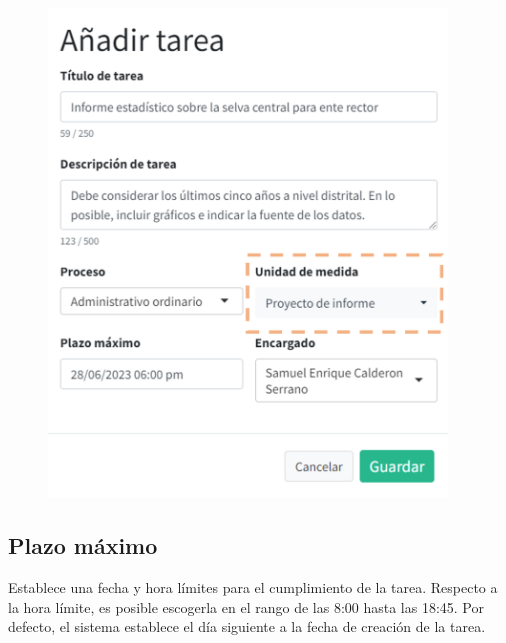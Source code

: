 \documentclass[
  letterpaper,
  DIV=11,
  numbers=noendperiod]{scrreprt}
\begin{document}
\begin{figure}

{\centering \includegraphics[width=4.16667in,height=\textheight]{./img/manual-user/new-task-unit.png}

}

\end{figure}

\hypertarget{plazo-muxe1ximo}{%
\subsection{Plazo máximo}\label{plazo-muxe1ximo}}

Establece una fecha y hora límites para el cumplimiento de la tarea.
Respecto a la hora límite, es posible escogerla en el rango de las 8:00
hasta las 18:45. Por defecto, el sistema establece el día siguiente a la
fecha de creación de la tarea.
\end{document}
